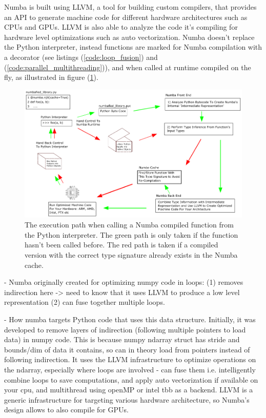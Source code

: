 \documentclass{IEEEcsmag}
\begin{document}
Numba is built using LLVM, a tool for building custom compilers, that provides an API to generate machine code for different hardware architectures such as CPUs and GPUs. LLVM is also able to analyze the code it's compiling for hardware level optimizations such as auto vectorization. Numba doesn't replace the Python interpreter, instead  functions are marked for Numba compilation with a decorator (see listings (\ref{code:loop_fusion}) and (\ref{code:parallel_multithreading})), and when called at runtime compiled on the fly, as illustrated in figure (\ref{fig:numba}).

\begin{figure}
    \centerline{\includegraphics {figures/numba.pdf}}
    \caption{The execution path when calling a Numba compiled function from the Python interpreter. The green path is only taken if the function hasn't been called before. The red path is taken if a compiled version with the correct type signature already exists in the Numba cache.}
    \label{fig:numba}
\end{figure}
	




- Numba originally created for optimizing numpy code in loops: (1) removes indirection here -> need to know that it uses LLVM to produce a low level representation (2) can fuse together multiple loops.

- How numba targets Python code that uses this data structure. Initially, it was developed to remove layers of indirection (following multiple pointers to load data) in numpy code. This is because numpy ndarray struct has stride and bounds/dim of data it contains, so can in theory load from pointers instead of following indirection. It uses the LLVM infrastructure to optimize operations on the ndarray, especially where loops are involved - can fuse them i.e. intelligently combine loops to save computations, and apply auto vectorization if available on your cpu, and multithread using openMP or intel tbb as a backend. LLVM is a generic infrastructure for targeting various hardware architecture, so Numba's design allows to also compile for GPUs.
\end{document}
